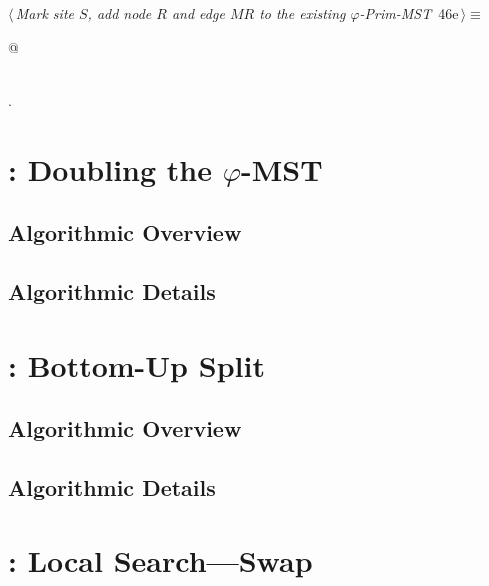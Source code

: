 \documentclass[11.5pt]{report}
\begin{document}
\begin{flushleft} \small
\begin{minipage}{\linewidth}\label{scrap58}\raggedright\small
{} $\langle\,${\itshape Mark site $S$, add node $R$ and edge $MR$ to the existing $\varphi$-Prim-MST}\nobreak\ {\footnotesize {46e}}$\,\rangle\equiv$
\vspace{-1ex}
\begin{list}{}{} \item
\mbox{}\verb@   @\\
\mbox{}\verb@pass@\\
\mbox{}\verb@@{\NWsep}
\end{list}
\vspace{-1.5ex}
\footnotesize
\begin{list}{}{\setlength{\itemsep}{-\parsep}\setlength{\itemindent}{-\leftmargin}}
\item {\NWtxtMacroNoRef}.

\item{}
\end{list}
\end{minipage}\vspace{4ex}
\end{flushleft}
\section{: Doubling the $\varphi$-MST}  

\subsection{Algorithmic Overview}
\subsection{Algorithmic Details}
\section{: Bottom-Up Split}  

\subsection{Algorithmic Overview}
\subsection{Algorithmic Details}\section{: Local Search---Swap}  
\end{document}
